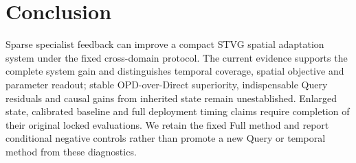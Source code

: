 \documentclass[10pt,twocolumn,letterpaper]{article}
\begin{document}
\section{Conclusion}
Sparse specialist feedback can improve a compact STVG spatial adaptation
system under the fixed cross-domain protocol. The current evidence supports
the complete system gain and distinguishes temporal coverage, spatial
objective and parameter readout; stable OPD-over-Direct superiority,
indispensable Query residuals and causal gains from inherited state remain
unestablished. Enlarged state, calibrated baseline and full deployment timing
claims require completion of their original locked evaluations. We retain the
fixed Full method and report conditional negative controls rather than
promote a new Query or temporal method from these diagnostics.


	{\small
		
		
	}
\end{document}
